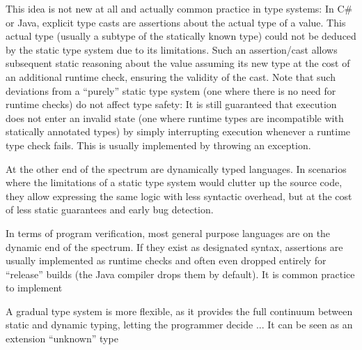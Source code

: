 This idea is not new at all and actually common practice in type systems:
In C\# or Java, explicit type casts are assertions about the actual type of a value.
This actual type (usually a subtype of the statically known type) could not be deduced by the static type system due to its limitations.
Such an assertion/cast allows subsequent static reasoning about the value assuming its new type at the cost of an additional runtime check, ensuring the validity of the cast.
Note that such deviations from a “purely” static type system (one where there is no need for runtime checks) do not affect type safety:
It is still guaranteed that execution does not enter an invalid state (one where runtime types are incompatible with statically annotated types) by simply interrupting execution whenever a runtime type check fails.
This is usually implemented by throwing an exception.


At the other end of the spectrum are dynamically typed languages.
In scenarios where the limitations of a static type system would clutter up the source code, they allow expressing the same logic with less syntactic overhead, but at the cost of less static guarantees and early bug detection.

In terms of program verification, most general purpose languages are on the dynamic end of the spectrum.
If they exist as designated syntax, assertions are usually implemented as runtime checks and often even dropped entirely for “release” builds (the Java compiler drops them by default).
It is common practice to implement 

%    

A gradual type system is more flexible, as it provides the full continuum between static and dynamic typing, letting the programmer decide ... %
It can be seen as an extension  “unknown” type 



